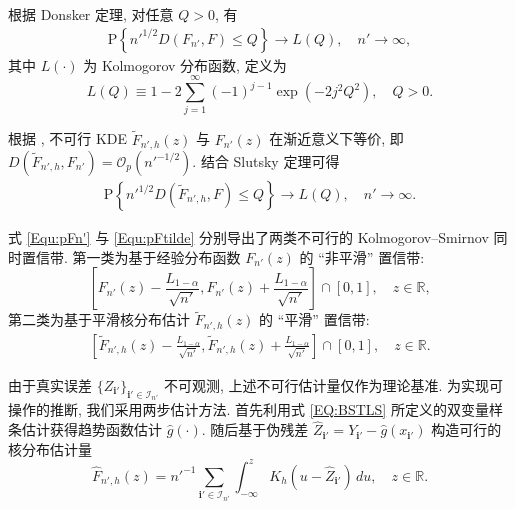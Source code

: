 \documentclass[a4paper,openay,14pt]{ctexbook}
\numberwithin{equation}{section}
\numberwithin{lem}{section}
\begin{document}
根据 Donsker 定理, 对任意 $Q>0$, 有
\begin{align}\label{Equ:pFn'}
\mathrm{P}\left\{ n'^{1/2} D\left(F_{n'}, F\right) \le Q \right\}
\rightarrow L(Q), \quad n' \rightarrow \infty,
\end{align}
其中 $L(\cdot)$ 为 Kolmogorov 分布函数, 定义为
\[
L(Q) \equiv 1 - 2 \sum_{j=1}^{\infty} (-1)^{j-1} \exp\left(-2 j^2 Q^2\right), 
\quad Q>0.
\]

根据 \cite{wang2013smooth}, 不可行 KDE $\tilde{F}_{n',h}(z)$ 与 $F_{n'}(z)$ 在渐近意义下等价, 即
$D(\tilde{F}_{n',h}, F_{n'}) = \mathcal{O}_p(n'^{-1/2})$. 结合 Slutsky 定理可得
\begin{align}\label{Equ:pFtilde}
\mathrm{P}\left\{ n'^{1/2} D\left(\tilde{F}_{n',h}, F\right) \le Q \right\}
\rightarrow L(Q), \quad n' \rightarrow \infty.
\end{align}

式 \eqref{Equ:pFn'} 与 \eqref{Equ:pFtilde} 分别导出了两类不可行的 Kolmogorov--Smirnov 同时置信带. 第一类为基于经验分布函数 $F_{n'}(z)$ 的 ``非平滑'' 置信带:
\[
\left[
F_{n'}(z) - \frac{L_{1-\alpha}}{\sqrt{n'}},
F_{n'}(z) + \frac{L_{1-\alpha}}{\sqrt{n'}}
\right] \cap [0,1], 
\quad z \in \mathbb{R},
\]
第二类为基于平滑核分布估计 $\tilde{F}_{n',h}(z)$ 的 ``平滑'' 置信带:
\begin{align} \label{SCB:Ftilden'}
    \left[ \tilde{F}_{n',h}(z) - \frac{L_{1-\alpha}}{\sqrt{n'}},\tilde{F}_{n',h}(z) + \frac{L_{1-\alpha}}{\sqrt{n'}} \right] \cap [0,1], \quad z \in \mathbb{R}.
\end{align}

由于真实误差 $\{Z_{\mathbf{i}'}\}_{\mathbf{i}' \in \mathcal{I}_{n'}}$ 不可观测, 上述不可行估计量仅作为理论基准. 为实现可操作的推断, 我们采用两步估计方法. 首先利用式 \eqref{EQ:BSTLS} 所定义的双变量样条估计获得趋势函数估计 $\hat{g}(\cdot)$. 随后基于伪残差
$\hat{Z}_{\mathbf{i}'} = Y_{\mathbf{i}'} - \hat{g}(x_{\mathbf{i}'})$
构造可行的核分布估计量
\begin{equation}\label{EQ:Fn'hhat}
\hat{F}_{n',h}(z)
= n'^{-1} \sum_{\mathbf{i}' \in \mathcal{I}_{n'}}
\int_{-\infty}^{z} K_h(u - \hat{Z}_{\mathbf{i}'}) \, du,
\quad z \in \mathbb{R}.
\end{equation}
\end{document}
